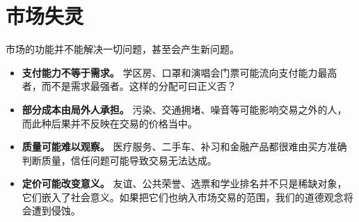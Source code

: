 \documentclass[UTF8,10pt,a4paper,scheme=chinese,fontset=none]{ctexart}
\begin{document}


\section{市场失灵}

市场的功能并不能解决一切问题，甚至会产生新问题。

\begin{itemize}
  \item \textbf{支付能力不等于需求。} 学区房、口罩和演唱会门票可能流向支付能力最高者，而不是需求最强者。这样的分配可曰正义否？
  \item \textbf{部分成本由局外人承担。} 污染、交通拥堵、噪音等可能影响交易之外的人，而此种后果并不反映在交易的价格当中。
  \item \textbf{质量可能难以观察。} 医疗服务、二手车、补习和金融产品都很难由买方准确判断质量，信任问题可能导致交易无法达成。
  \item \textbf{定价可能改变意义。} 友谊、公共荣誉、选票和学业排名并不只是稀缺对象，它们嵌入了社会意义。如果把它们也纳入市场交易的范围，我们的道德观念将会遭到侵蚀。
\end{itemize}
\end{document}
